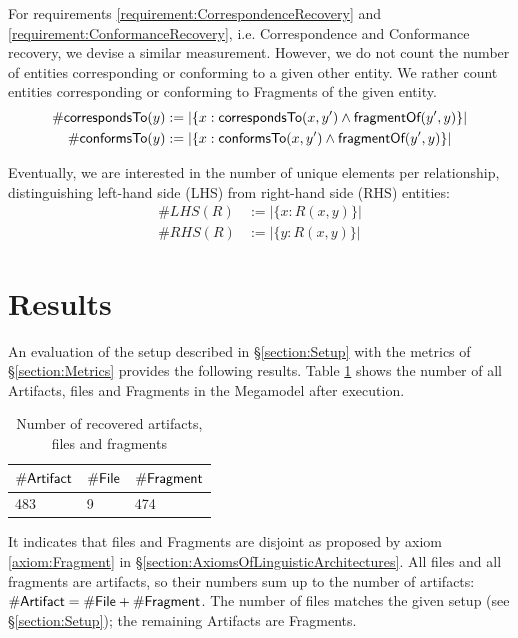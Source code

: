 For requirements \ref{requirement:CorrespondenceRecovery} and \ref{requirement:ConformanceRecovery}, i.e. \gls{Correspondence} and \gls{Conformance} recovery, we devise a similar measurement.
However, we do not count the number of entities corresponding or conforming to a given other entity.
We rather count entities corresponding or conforming to \glspl{Fragment} of the given entity.
\begin{align*}
\#\textsf{correspondsTo}(y) &:=
|\{ x : \textsf{correspondsTo}(x,y') \wedge \textsf{fragmentOf}(y',y)  \}|
\\
\#\textsf{conformsTo}(y) &:=
|\{ x : \textsf{conformsTo}(x,y') \wedge \textsf{fragmentOf}(y',y)  \}|
\end{align*}

Eventually, we are interested in the number of unique elements per relationship, distinguishing left-hand side (LHS) from right-hand side (RHS) entities: 
\begin{align*}
\#LHS(R) &:= |\{ x : R(x,y) \}| \\
\#RHS(R) &:= |\{ y : R(x,y) \}| 
\end{align*}

\section{Results}
\label{section:Results}
An evaluation of the setup described in §\ref{section:Setup} with the metrics of §\ref{section:Metrics} provides the following results.
Table \ref{table:NumberOfRecoveredArtifactsFilesAndFragments} shows the number of all \glspl{Artifact}, files and \glspl{Fragment} in the \gls{Megamodel} after execution.
\begin{table}[h!]
\begin{center}
\begin{tabular}{|l|l|l|}
\hline
$\#\textsf{Artifact}$ & $\#\textsf{File}$ & $\#\textsf{Fragment}$
\\ \hline
483 & 9 & 474 
\\ \hline
\end{tabular}
\end{center}
\caption{Number of recovered artifacts, files and fragments}
\label{table:NumberOfRecoveredArtifactsFilesAndFragments}
\end{table}
It indicates that files and \glspl{Fragment} are disjoint as proposed by axiom \ref{axiom:Fragment} in §\ref{section:AxiomsOfLinguisticArchitectures}.
All files and all fragments are artifacts, so their numbers sum up to the number of artifacts: $\#\textsf{Artifact} = \#\textsf{File} + \#\textsf{Fragment}$.
The number of files matches the given setup (see §\ref{section:Setup}); the remaining \glspl{Artifact} are \glspl{Fragment}.

